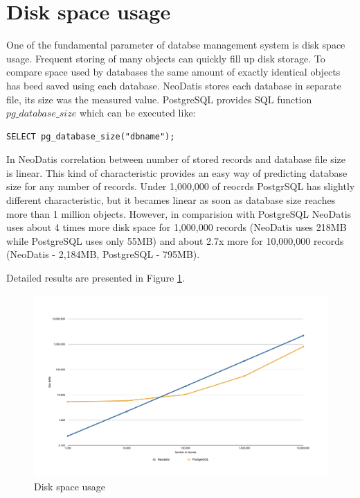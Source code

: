 \documentclass[a4paper,titlepage,12pt]{article}
\begin{document}
\section{Disk space usage}\label{sec:disk_space_usage}
One of the fundamental parameter of databse management system is disk space usage.
Frequent storing of many objects can quickly fill up disk storage. To compare space used by databases the same amount of exactly identical objects has beed saved using each database. NeoDatis stores each database in separate file, its size was the measured value. PostgreSQL provides SQL function $pg\_database\_size$ which can be executed like:

\begin{lstlisting}[caption=PostgeSQL database size]
SELECT pg_database_size("dbname");
\end{lstlisting}


In NeoDatis correlation between number of stored records and database file size is linear. This kind of characteristic provides an easy way of predicting database size for any number of records. Under 1,000,000 of reocrds PostgrSQL has slightly different characteristic, but it becames linear as soon as database size reaches more than 1 million objects. However, in comparision with PostgreSQL NeoDatis uses about 4 times more disk space for 1,000,000 records (NeoDatis uses 218MB while PostgreSQL uses only 55MB) and about 2.7x more for 10,000,000 records (NeoDatis - 2,184MB, PostgreSQL - 795MB).

Detailed results are presented in Figure \ref{fig:size}.


\begin{landscape}
    \begin{figure}[p]
        \includegraphics[scale=0.5]{FigSize.pdf}
        \caption{Disk space usage}
        \label{fig:size}
    \end{figure}
\end{landscape}
\end{document}
